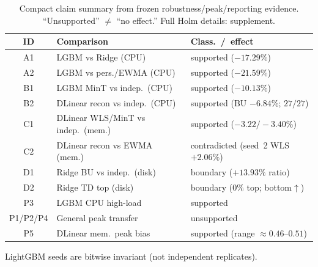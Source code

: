 \begin{table}[width=\columnwidth,pos=!ht]
\centering
\caption{Compact claim summary from frozen robustness/peak/reporting evidence.
``Unsupported'' $\neq$ ``no effect.'' Full Holm details: supplement.}
\label{tab:stats}
\begin{threeparttable}
\scriptsize
\setlength{\tabcolsep}{2.2pt}
\begin{tabularx}{\tblwidth}{@{}c>{\raggedright\arraybackslash}X>{\raggedright\arraybackslash}X@{}}
\toprule
ID & Comparison & Class.\ /\ effect \\
\midrule
A1 & LGBM vs Ridge (CPU) & supported ($-17.29\%$) \\
A2 & LGBM vs pers./{EWMA} (CPU) & supported ($-21.59\%$) \\
B1 & LGBM MinT vs indep.\ (CPU) & supported ($-10.13\%$) \\
B2 & DLinear recon vs indep.\ (CPU) & supported (BU $-6.84\%$; $27/27$) \\
C1 & DLinear WLS/MinT vs indep.\ (mem.) & supported ($-3.22/-3.40\%$) \\
C2 & DLinear recon vs {EWMA} (mem.) & contradicted (seed~2 {WLS} $+2.06\%$) \\
D1 & Ridge BU vs indep.\ (disk) & boundary ($+13.93\%$ ratio) \\
D2 & Ridge TD top (disk) & boundary ($0\%$ top; bottom$\uparrow$) \\
P3 & LGBM CPU high-load & supported \\
P1/P2/P4 & General peak transfer & unsupported \\
P5 & DLinear mem.\ peak bias & supported (range $\approx0.46$--$0.51$) \\
\bottomrule
\end{tabularx}
\begin{tablenotes}
\footnotesize
\item LightGBM seeds are bitwise invariant (not independent replicates).
\end{tablenotes}
\end{threeparttable}
\end{table}
